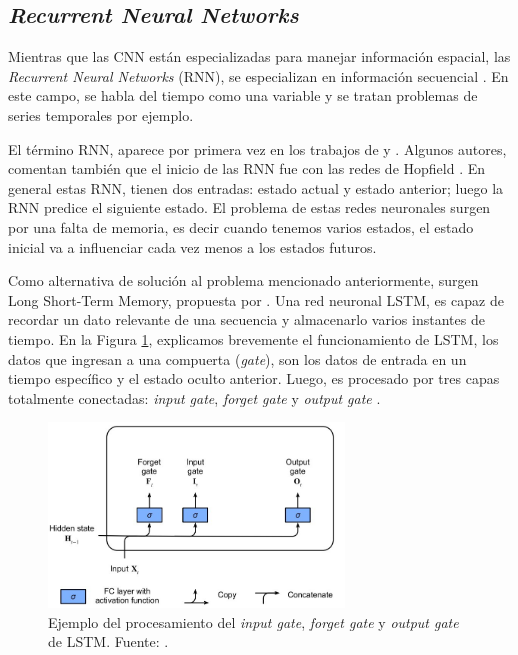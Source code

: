\subsection{\textit{Recurrent Neural Networks}}

Mientras que las CNN están especializadas para manejar información espacial, las \textit{Recurrent Neural Networks} (RNN), se especializan en información secuencial  \citep{zhang2021dive}. En este campo, se habla del tiempo como una variable y se tratan problemas de series temporales por ejemplo.

El término RNN, aparece por primera vez en los trabajos de \cite{rumelhart1985learning} y \cite{jordan1997serial}. Algunos autores, comentan también que el inicio de las RNN fue con las redes de Hopfield  \citep{hopfield1982neural}. En general estas RNN, tienen dos entradas: estado actual y estado anterior; luego la RNN predice el siguiente estado. El problema de estas redes neuronales surgen por una falta de memoria, es decir cuando tenemos varios estados, el estado inicial va a influenciar cada vez menos a los estados futuros.

Como alternativa de solución al problema mencionado anteriormente, surgen Long Short-Term Memory, propuesta por \cite{hochreiter1997long}. Una red neuronal LSTM, es capaz de recordar un dato relevante de una secuencia y almacenarlo varios instantes de tiempo. En la Figura \ref{fig:lstm}, explicamos brevemente el funcionamiento de LSTM, los datos que ingresan a una compuerta (\textit{gate}), son los datos de entrada en un tiempo específico y el estado oculto anterior. Luego, es procesado por tres capas totalmente conectadas: \textit{input gate}, \textit{forget gate} y \textit{output gate} \citep{zhang2021dive}.

\begin{figure}[H]
	\centering
	\includegraphics[width=0.7\textwidth]{img/neoantigen/lstm}
	\caption{Ejemplo del procesamiento del \textit{input gate}, \textit{forget gate} y \textit{output gate} de LSTM. Fuente: \cite{zhang2021dive}.}
	\label{fig:lstm}
\end{figure}

